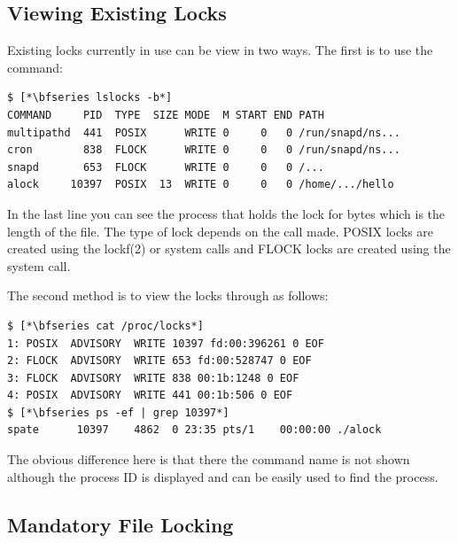 
\subsection{Viewing Existing Locks}

Existing locks currently in use can be view in two ways. The first is to use the  command:

\begin{lstlisting}
$ [*\bfseries lslocks -b*]
COMMAND     PID  TYPE  SIZE MODE  M START END PATH
multipathd  441  POSIX      WRITE 0     0   0 /run/snapd/ns...
cron        838  FLOCK      WRITE 0     0   0 /run/snapd/ns...
snapd       653  FLOCK      WRITE 0     0   0 /...
alock     10397  POSIX  13  WRITE 0     0   0 /home/.../hello
\end{lstlisting}

\noindent
In the last line you can see the  process that holds the  lock for  bytes which is the length of the file. The type of lock depends on the call made. POSIX locks are created using the lockf(2) or  system calls and FLOCK locks are created using the  system call. 

The second method is to view the locks through  as follows:

\begin{lstlisting}
$ [*\bfseries cat /proc/locks*]
1: POSIX  ADVISORY  WRITE 10397 fd:00:396261 0 EOF
2: FLOCK  ADVISORY  WRITE 653 fd:00:528747 0 EOF
3: FLOCK  ADVISORY  WRITE 838 00:1b:1248 0 EOF
4: POSIX  ADVISORY  WRITE 441 00:1b:506 0 EOF
$ [*\bfseries ps -ef | grep 10397*]
spate      10397    4862  0 23:35 pts/1    00:00:00 ./alock
\end{lstlisting}

\noindent
The obvious difference here is that there the command name is not shown although the process ID is displayed and can be easily used to find the process.


\subsection{Mandatory File Locking}

